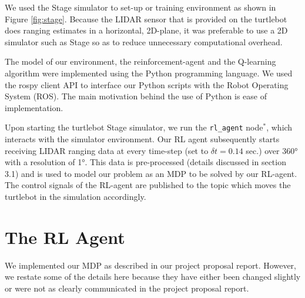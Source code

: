 \documentclass{article}
\begin{document}
We used the Stage simulator to set-up or training environment as shown in Figure \ref{fig:stage}. Because the LIDAR sensor that is provided on the turtlebot does ranging estimates in a horizontal, 2D-plane, it was preferable to use a 2D simulator such as Stage so as to reduce unnecessary computational overhead.

The model of our environment, the reinforcement-agent and the Q-learning algorithm were implemented using the Python programming language. We used the rospy client API to interface our Python scripts with the Robot Operating System (ROS). The main motivation behind the use of Python is ease of implementation.

Upon starting the turtlebot Stage simulator, we run the \texttt{rl\_agent} node$^\ast$, which interacts with the simulator environment. Our RL agent subsequently starts receiving LIDAR ranging data at every time-step (set to $\delta t = 0.14$ sec.) over \ang{360} with a resolution of \ang{1}. This data is pre-processed (details discussed in section 3.1) and is used to model our problem as an MDP to be solved by our RL-agent. The control signals of the RL-agent are published to the topic  which moves the turtlebot in the simulation accordingly.


\section{The RL Agent}
We implemented our MDP as described in our project proposal report. However, we restate some of the details here because they have either been changed slightly or were not as clearly communicated in the project proposal report.
\end{document}
